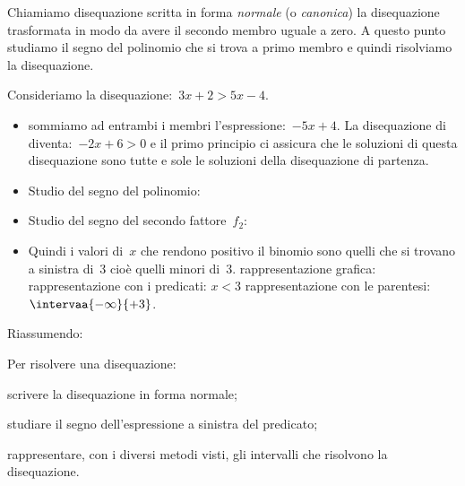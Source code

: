 Chiamiamo disequazione scritta in forma \emph{normale} (o \emph{canonica})
la disequazione trasformata in modo da avere il secondo membro uguale a 
zero.
A questo punto studiamo il segno del polinomio che si trova a primo 
membro e quindi risolviamo la disequazione.

\begin{esempio}{}{}
Consideriamo la disequazione:~\(3x + 2 > 5 x -4\).
\begin{itemize} [noitemsep, left=0mm]
\item sommiamo ad entrambi i membri l'espressione:~\(-5 x +4\). 
La disequazione di diventa:~\(-2 x +6 > 0\) e il primo principio ci 
assicura che le soluzioni di questa disequazione sono tutte e sole le 
soluzioni della disequazione di partenza.
\item Studio del segno del polinomio: \\
\item Studio del segno del secondo fattore~\(f_2\):\\
\hspace*{-5mm} 

\vspace{-4mm}
\item Quindi i valori di~\(x\) che rendono positivo il binomio sono quelli 
che si trovano a sinistra di~3 cioè quelli minori di~3. 
\subitem 
rappresentazione grafica: \quad
{}
\subitem rappresentazione con i predicati: \quad \(x < 3\) 
\subitem rappresentazione con le parentesi: \quad 
\(\intervaa{-\infty}{+3}\). 
\end{itemize}
\end{esempio}

Riassumendo:

\begin{procedura}{}{}
Per risolvere una disequazione:
\begin{enumeratea}
\item scrivere la disequazione in forma normale;
\item studiare il segno dell'espressione a sinistra del predicato;
\item rappresentare, con i diversi metodi visti, 
gli intervalli che risolvono la disequazione.
\end{enumeratea}
\end{procedura}

